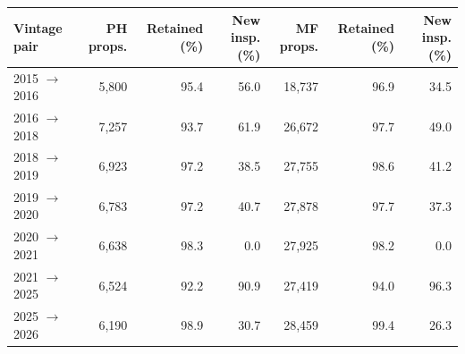 \begin{tabular}{lrrrrrr}
\toprule
Vintage pair & PH props. & Retained (\%) & New insp. (\%) & MF props. & Retained (\%) & New insp. (\%) \\
\midrule
2015 $\rightarrow$ 2016 & 5,800 & 95.4 & 56.0 & 18,737 & 96.9 & 34.5 \\
2016 $\rightarrow$ 2018 & 7,257 & 93.7 & 61.9 & 26,672 & 97.7 & 49.0 \\
2018 $\rightarrow$ 2019 & 6,923 & 97.2 & 38.5 & 27,755 & 98.6 & 41.2 \\
2019 $\rightarrow$ 2020 & 6,783 & 97.2 & 40.7 & 27,878 & 97.7 & 37.3 \\
2020 $\rightarrow$ 2021 & 6,638 & 98.3 & 0.0 & 27,925 & 98.2 & 0.0 \\
2021 $\rightarrow$ 2025 & 6,524 & 92.2 & 90.9 & 27,419 & 94.0 & 96.3 \\
2025 $\rightarrow$ 2026 & 6,190 & 98.9 & 30.7 & 28,459 & 99.4 & 26.3 \\
\bottomrule
\end{tabular}
